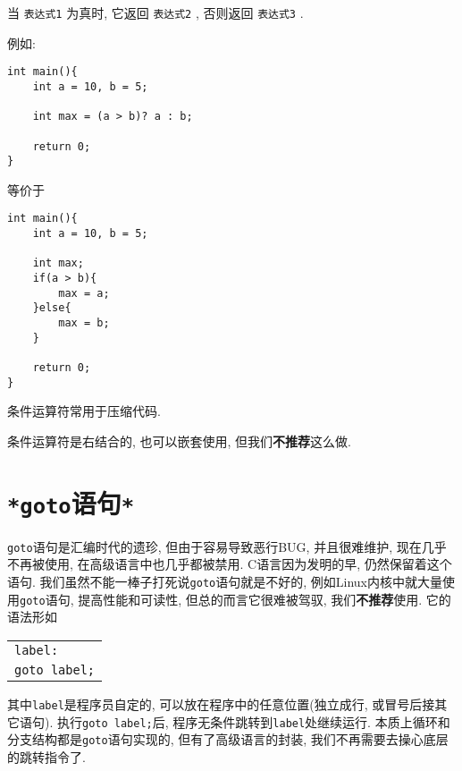         当 \texttt{表达式\vspace*{-1pt}1} 为真时, 它返回 \texttt{表达式\vspace*{-1pt}2} , 否则返回 \texttt{表达式\vspace*{-1pt}3} .

        例如:
\begin{lstlisting}
int main(){
    int a = 10, b = 5;

    int max = (a > b)? a : b;

    return 0;
}
\end{lstlisting}
        等价于
\begin{lstlisting}
int main(){
    int a = 10, b = 5;

    int max;
    if(a > b){
        max = a;
    }else{
        max = b;
    }

    return 0;
}
\end{lstlisting}

        条件运算符常用于压缩代码.

        条件运算符是右结合的, 也可以嵌套使用, 但我们\textbf{不推荐}这么做.

    \section{\texttt{*goto}语句\texttt{*}}
        \texttt{goto}语句是汇编时代的遗珍, 但由于容易导致恶行BUG, 并且很难维护, 现在几乎不再被使用, 在高级语言中也几乎都被禁用. C语言因为发明的早, 仍然保留着这个语句. 我们虽然不能一棒子打死说\texttt{goto}语句就是不好的, 例如Linux内核中就大量使用\texttt{goto}语句, 提高性能和可读性, 但总的而言它很难被驾驭, 我们\textbf{不推荐}使用. 它的语法形如
        \begin{center}
        \begin{longtable}{l}
            \texttt{label:} \\
            \texttt{goto label;}
        \end{longtable}
        \end{center}

        其中\texttt{label}是程序员自定的, 可以放在程序中的任意位置(独立成行, 或冒号后接其它语句). 执行\texttt{goto label;}后, 程序无条件跳转到\texttt{label}处继续运行. 本质上循环和分支结构都是\texttt{goto}语句实现的, 但有了高级语言的封装, 我们不再需要去操心底层的跳转指令了.